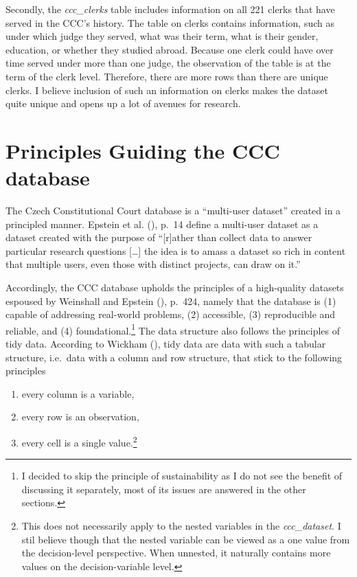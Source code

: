 \documentclass[
  11pt,
]{article}
\providecommand{\tightlist}{%
  \setlength{\itemsep}{0pt}\setlength{\parskip}{0pt}}
\begin{document}
Secondly, the \emph{ccc\_clerks} table includes information on all 221 clerks that have served in the CCC's history. The table on clerks contains information, such as under which judge they served, what was their term, what is their gender, education, or whether they studied abroad. Because one clerk could have over time served under more than one judge, the observation of the table is at the term of the clerk level. Therefore, there are more rows than there are unique clerks. I believe inclusion of such an information on clerks makes the dataset quite unique and opens up a lot of avenues for research.

\section{Principles Guiding the CCC database}\label{principles}

The Czech Constitutional Court database is a ``multi-user dataset'' created in a principled manner. Epstein et al. (), p.~14 define a multi-user dataset as a dataset created with the purpose of ``{[}r{]}ather than collect data to answer particular research questions {[}\ldots{]} the idea is to amass a dataset so rich in content that multiple users, even those with distinct projects, can draw on it.''

Accordingly, the CCC database upholds the principles of a high-quality datasets espoused by Weinshall and Epstein (), p.~424, namely that the database is (1) capable of addressing real-world problems, (2) accessible, (3) reproducible and reliable, and (4) foundational.\footnote{I decided to skip the principle of sustainability as I do not see the benefit of discussing it separately, most of its issues are answered in the other sections.} The data structure also follows the principles of tidy data. According to Wickham (), tidy data are data with such a tabular structure, i.e.~data with a column and row structure, that stick to the following principles

\begin{enumerate}
\def\labelenumi{(\arabic{enumi})}
\tightlist
\item
  every column is a variable,
\item
  every row is an observation,
\item
  every cell is a single value.\footnote{This does not necessarily apply to the nested variables in the \emph{ccc\_dataset}. I stil believe though that the nested variable can be viewed as a one value from the decision-level perspective. When unnested, it naturally contains more values on the decision-variable level.}
\end{enumerate}
\end{document}
